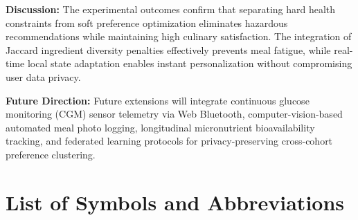 \documentclass[12pt,a4paper]{report}
\begin{document}
\vspace{0.3cm}
\noindent\textbf{Discussion:} The experimental outcomes confirm that separating hard health constraints from soft preference optimization eliminates hazardous recommendations while maintaining high culinary satisfaction. The integration of Jaccard ingredient diversity penalties effectively prevents meal fatigue, while real-time local state adaptation enables instant personalization without compromising user data privacy.

\vspace{0.3cm}
\noindent\textbf{Future Direction:} Future extensions will integrate continuous glucose monitoring (CGM) sensor telemetry via Web Bluetooth, computer-vision-based automated meal photo logging, longitudinal micronutrient bioavailability tracking, and federated learning protocols for privacy-preserving cross-cohort preference clustering.

\tableofcontents
\listoffigures
\listoftables

\chapter*{List of Symbols and Abbreviations}
\end{document}
